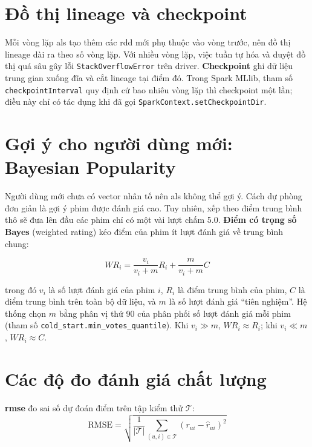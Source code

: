 \section{Đồ thị lineage và checkpoint}
\label{sec:checkpoint}
Mỗi vòng lặp \gls{als} tạo thêm các \gls{rdd} mới phụ thuộc vào vòng trước, nên đồ thị lineage dài ra theo số vòng lặp. Với nhiều vòng lặp, việc tuần tự hóa và duyệt đồ thị quá sâu gây lỗi \texttt{StackOverflowError} trên driver. \textbf{Checkpoint} ghi dữ liệu trung gian xuống đĩa và cắt lineage tại điểm đó. Trong Spark MLlib, tham số \texttt{checkpointInterval} quy định cứ bao nhiêu vòng lặp thì checkpoint một lần; điều này chỉ có tác dụng khi đã gọi \texttt{SparkContext.setCheckpointDir}.

\section{Gợi ý cho người dùng mới: Bayesian Popularity}
\label{sec:bayes}
Người dùng mới chưa có vector nhân tố nên \gls{als} không thể gợi ý. Cách dự phòng đơn giản là gợi ý phim được đánh giá cao. Tuy nhiên, xếp theo điểm trung bình thô sẽ đưa lên đầu các phim chỉ có một vài lượt chấm \num{5,0}. \textbf{Điểm có trọng số Bayes} (weighted rating) kéo điểm của phim ít lượt đánh giá về trung bình chung:
\begin{ctbox}
\begin{equation}
  WR_i = \frac{v_i}{v_i + m} R_i + \frac{m}{v_i + m} C
  \label{eq:bayes}
\end{equation}
\end{ctbox}
trong đó $v_i$ là số lượt đánh giá của phim $i$, $R_i$ là điểm trung bình của phim, $C$ là điểm trung bình trên toàn bộ dữ liệu, và $m$ là số lượt đánh giá ``tiên nghiệm''. Hệ thống chọn $m$ bằng phân vị thứ \num{90} của phân phối số lượt đánh giá mỗi phim (tham số \texttt{cold\_start.min\_votes\_quantile}). Khi $v_i \gg m$, $WR_i \approx R_i$; khi $v_i \ll m$, $WR_i \approx C$.

\section{Các độ đo đánh giá chất lượng}
\label{sec:do_do}
\textbf{\gls{rmse}} đo sai số dự đoán điểm trên tập kiểm thử $\mathcal{T}$:
\begin{equation}
  \mathrm{RMSE} = \sqrt{\frac{1}{|\mathcal{T}|} \sum_{(u,i) \in \mathcal{T}} \left( r_{ui} - \hat{r}_{ui} \right)^2 }
  \label{eq:rmse}
\end{equation}

